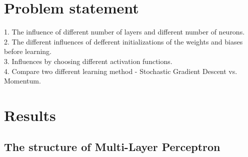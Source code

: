 \documentclass[12pt,a4paper]{article}
\begin{document}
\section{Problem statement}
1. The influence of different number of layers and different number of neurons.\\
2. The different influences of defferent initializations of the weights and biases before learning.\\
3. Influences by choosing different activation functions.\\
4. Compare two different learning method - Stochastic Gradient Descent vs. Momentum.\\

\section{Results}
\subsection{The structure of Multi-Layer Perceptron}
\end{document}
